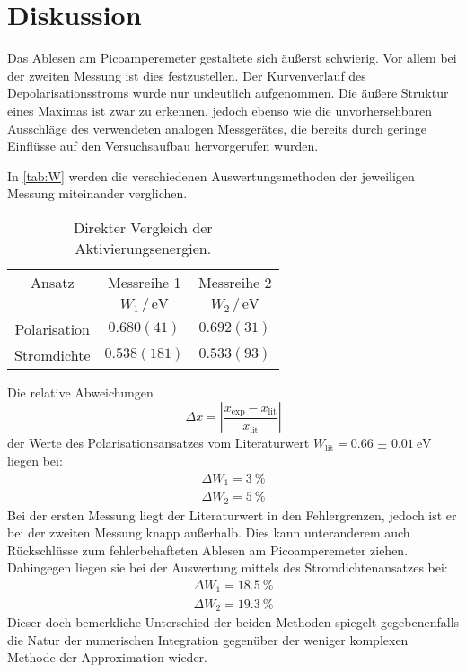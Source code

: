 \section{Diskussion}
\label{sec:Diskussion}
Das Ablesen am Picoamperemeter gestaltete sich äußerst schwierig. Vor allem bei der zweiten Messung ist dies festzustellen.
Der Kurvenverlauf des Depolarisationsstroms wurde nur undeutlich aufgenommen. Die äußere Struktur eines Maximas ist zwar zu erkennen,
jedoch ebenso wie die unvorhersehbaren Ausschläge des verwendeten analogen Messgerätes, die bereits durch geringe Einflüsse auf den Versuchsaufbau hervorgerufen wurden.

In \autoref{tab:W} werden die verschiedenen Auswertungsmethoden der jeweiligen Messung miteinander verglichen.
\begin{table}[h]
    \centering
    \caption{Direkter Vergleich der Aktivierungsenergien.}
    \label{tab:W}
    \begin{tabular}{cSS}
        \toprule
        {Ansatz} & {Messreihe 1} & {Messreihe 2}\\
        \cmidrule(lr){2-2}\cmidrule(lr){3-3}
        &{$W_1 \, / \, \si{\electronvolt}$} & {$W_2 \, / \, \si{\electronvolt}$} \\
        \midrule
        {Polarisation} & {$0.680(41)$} & {$0.692(31)$} \\   
        {Stromdichte}  & {$0.538(181)$} & {$0.533(93)$} \\
        \bottomrule
        \end{tabular}
\end{table}
\noindent
Die relative Abweichungen
\begin{equation}
    \Delta x = \left| \frac{x_\text{exp} - x_\text{lit}}{x_\text{lit}}\right|
\end{equation}
der Werte des Polarisationsansatzes vom Literaturwert $W_\text{lit} = \qty{0.66(1)}{\electronvolt}$\cite{Buch} liegen bei:
\begin{align}
    \Delta W_1 = \qty{3}{\percent} \\
    \Delta W_2 = \qty{5}{\percent}
\end{align}
Bei der ersten Messung liegt der Literaturwert in den Fehlergrenzen, jedoch ist er bei der zweiten Messung knapp außerhalb.
Dies kann unteranderem auch Rückschlüsse zum fehlerbehafteten Ablesen am Picoamperemeter ziehen.
Dahingegen liegen sie bei der Auswertung mittels des Stromdichtenansatzes bei:
\begin{align}
    \Delta W_1 = \qty{18.5}{\percent} \\
    \Delta W_2 = \qty{19.3}{\percent}
\end{align}
Dieser doch bemerkliche Unterschied der beiden Methoden spiegelt gegebenenfalls die Natur der numerischen Integration gegenüber der
weniger komplexen Methode der Approximation wieder. 


